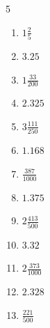\documentclass[12pt]{article}
\begin{document}
\begin{multicols}{5}
\begin{enumerate}
		\item $ 1 \frac{2}{5} $
		\item $ 3.25 $
		\item $ 1 \frac{33}{200} $
		\item $ 2.325 $
		\item $ 3 \frac{111}{250} $
		\item $ 1.168 $
		\item $ \frac{387}{1000} $
		\item $ 1.375 $
		\item $ 2 \frac{413}{500} $
		\item $ 3.32 $
		\item $ 2 \frac{373}{1000} $
		\item $ 2.328 $
		\item $ \frac{221}{500} $
	\end{enumerate}\end{multicols}\newpage
\end{document}
